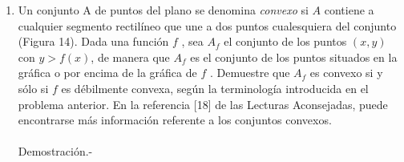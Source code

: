 \begin{enumerate}[\bfseries 1.]
    \item Un conjunto A de puntos del plano se denomina \textit{convexo} si $A$ contiene a cualquier segmento rectilíneo que une a dos puntos cualesquiera del conjunto (Figura 14). Dada una función $f$ , sea $A_f$ el conjunto de los puntos $(x,y)$ con $y> f(x)$, de manera que $A_f$ es el conjunto de los puntos situados en la gráfica o por encima de la gráfica de $f$ . Demuestre que $A_f$ es convexo si y sólo si $f$ es débilmente convexa, según la terminología introducida en el problema anterior. En la referencia [18] de las Lecturas Aconsejadas, puede encontrarse más información referente a los conjuntos convexos.\\\\
	Demostración.-\; 

\end{enumerate}
